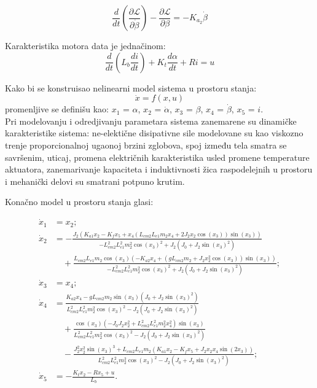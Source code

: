 \documentclass[a4paper,11pt]{article}
\theoremstyle{definition} \newtheorem{deff}{Definicija}[section]
\theoremstyle{definition} \newtheorem{prim}[deff]{Primer}
\theoremstyle{plain} \newtheorem{teor}[deff]{Teorema}
\begin{document}
	\begin{equation}
		\frac{d}{dt} \left( \frac{\partial \mathcal{L}}{\partial \dot\beta} \right) - \frac{\partial \mathcal{L}}{\partial \beta} = -K_{a_2} \dot\beta
	\end{equation}
	
	Karakteristika motora data je jednačinom: 
	\begin{equation}
		\frac{d}{dt} \left( L_b \frac{di}{dt} \right) + K_t \frac{d\alpha}{dt} + R i = u
	\end{equation}
	
	Kako bi se konstruisao nelinearni model sistema u prostoru stanja: 
	\begin{equation}
		\dot x = f(x, u)
	\end{equation}
	promenljive se definišu kao: $x_1$ = $\alpha$, $x_2$ = $\dot\alpha$,  $x_3$ = $\beta$, $x_4$ = $\dot\beta$, $x_5$ = $i$. \\
	
	
	Pri modelovanju i odredjivanju parametara sistema
	zanemarene su dinamičke karakteristike sistema: ne-elektične disipativne sile modelovane su kao viskozno trenje proporcionalnoj ugaonoj brzini zglobova, spoj između tela smatra se savršenim, uticaj, promena električnih karakteristika usled promene temperature aktuatora, zanemarivanje kapaciteta i induktivnosti žica raspodelejnih u prostoru i mehanički delovi su smatrani potpuno krutim.\\
	
	
	\newpage
	
	Konačno model u prostoru stanja glasi:
	
	\begin{equation}
		\begin{aligned}
			\dot{x}_1 &= x_2; \\[0.8em]
			\dot{x}_2 &= -\frac{J_2(K_{a1}x_2 - K_fx_5 + x_4(L_{cm2}L_{e1}m_2x_4 + 2J_2x_2\cos(x_3))\sin(x_3))}{-L_{cm2}^2L_{e1}^2m_2^2\cos(x_3)^2 + J_2(J_0 + J_2\sin(x_3)^2)} \\[0.8em]
			&\quad + \frac{L_{cm2}L_{e1}m_2\cos(x_3)(-K_{a2}x_4 + (gL_{cm2}m_2 + J_2x_2^2\cos(x_3))\sin(x_3))}{-L_{cm2}^2L_{e1}^2m_2^2\cos(x_3)^2 + J_2(J_0 + J_2\sin(x_3)^2)}; \\[0.8em]
			\dot{x}_3 &= x_4; \\[0.5em]
			\dot{x}_4 &= \frac{K_{a2}x_4 - gL_{cm2}m_2\sin(x_3)(J_0 + J_2\sin(x_3)^2)}{L_{cm2}^2L_{e1}^2m_2^2\cos(x_3)^2 - J_2(J_0 + J_2\sin(x_3)^2)} \\[0.8em]
			&\quad + \frac{\cos(x_3)(-J_0J_2x_2^2 + L_{cm2}^2L_{e1}^2m_2^2x_4^2)\sin(x_3)}{L_{cm2}^2L_{e1}^2m_2^2\cos(x_3)^2 - J_2(J_0 + J_2\sin(x_3)^2)} \\[0.8em]
			&\quad - \frac{J_2^2x_2^2\sin(x_3)^3 + L_{cm2}L_{e1}m_2(K_{a1}x_2 - K_fx_5 + J_2x_2x_4\sin(2x_3))}{L_{cm2}^2L_{e1}^2m_2^2\cos(x_3)^2 - J_2(J_0 + J_2\sin(x_3)^2)};\\[0.5em]
			\dot{x}_5 &= -\frac{K_tx_2 - Rx_5 + u}{L_b}.
		\end{aligned}
		\label{eq:nonModel}
	\end{equation}\\
	
\end{document}
